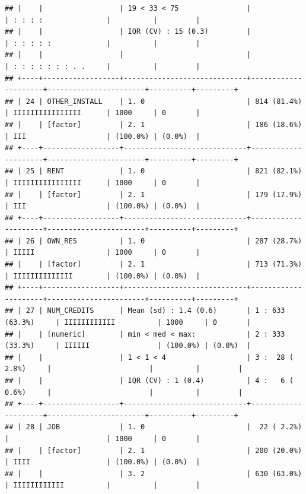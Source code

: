 \documentclass[
]{article}
\begin{document}
\begin{verbatim}
## |    |                  | 19 < 33 < 75                |                     | : : : :               |          |         |
## |    |                  | IQR (CV) : 15 (0.3)         |                     | : : : : :             |          |         |
## |    |                  |                             |                     | : : : : : : : . .     |          |         |
## +----+------------------+-----------------------------+---------------------+-----------------------+----------+---------+
## | 24 | OTHER_INSTALL    | 1. 0                        | 814 (81.4%)         | IIIIIIIIIIIIIIII      | 1000     | 0       |
## |    | [factor]         | 2. 1                        | 186 (18.6%)         | III                   | (100.0%) | (0.0%)  |
## +----+------------------+-----------------------------+---------------------+-----------------------+----------+---------+
## | 25 | RENT             | 1. 0                        | 821 (82.1%)         | IIIIIIIIIIIIIIII      | 1000     | 0       |
## |    | [factor]         | 2. 1                        | 179 (17.9%)         | III                   | (100.0%) | (0.0%)  |
## +----+------------------+-----------------------------+---------------------+-----------------------+----------+---------+
## | 26 | OWN_RES          | 1. 0                        | 287 (28.7%)         | IIIII                 | 1000     | 0       |
## |    | [factor]         | 2. 1                        | 713 (71.3%)         | IIIIIIIIIIIIII        | (100.0%) | (0.0%)  |
## +----+------------------+-----------------------------+---------------------+-----------------------+----------+---------+
## | 27 | NUM_CREDITS      | Mean (sd) : 1.4 (0.6)       | 1 : 633 (63.3%)     | IIIIIIIIIIII          | 1000     | 0       |
## |    | [numeric]        | min < med < max:            | 2 : 333 (33.3%)     | IIIIII                | (100.0%) | (0.0%)  |
## |    |                  | 1 < 1 < 4                   | 3 :  28 ( 2.8%)     |                       |          |         |
## |    |                  | IQR (CV) : 1 (0.4)          | 4 :   6 ( 0.6%)     |                       |          |         |
## +----+------------------+-----------------------------+---------------------+-----------------------+----------+---------+
## | 28 | JOB              | 1. 0                        |  22 ( 2.2%)         |                       | 1000     | 0       |
## |    | [factor]         | 2. 1                        | 200 (20.0%)         | IIII                  | (100.0%) | (0.0%)  |
## |    |                  | 3. 2                        | 630 (63.0%)         | IIIIIIIIIIII          |          |         |

\end{verbatim}
\end{document}
